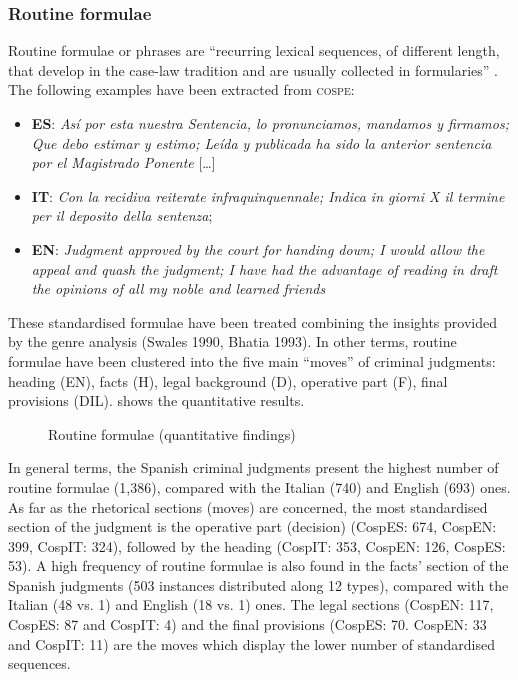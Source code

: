 \documentclass[output=paper]{LSP/langsci}
\begin{document}
\subsubsection{Routine formulae}
Routine formulae or phrases are “recurring lexical sequences, of different length, that develop in the case-law tradition and are usually collected in formularies” \citep[28--29]{Kjær1990}. The following examples have been extracted from \textsc{cospe}:

\begin{itemize}
\item \textbf{ES}: \textit{Así por esta nuestra Sentencia, lo pronunciamos, mandamos y firmamos; Que debo estimar y estimo; Leída y publicada ha sido la anterior sentencia por el Magistrado Ponente} […]
\item \textbf{IT}: \textit{Con la recidiva reiterate infraquinquennale; Indica in giorni X il termine per il deposito della sentenza};
\item \textbf{EN}: \textit{Judgment approved by the court for handing down; I would allow the appeal and quash the judgment; I have had the advantage of reading in draft the opinions of all my noble and learned friends}
\end{itemize}

These standardised formulae have been treated combining the insights provided by the genre analysis (Swales 1990, Bhatia 1993). In other terms, routine formulae have been clustered into the five main “moves” of criminal judgments: heading (EN), facts (H), legal background (D), operative part (F), final provisions (DIL).  shows the quantitative results.

\begin{figure}

\caption{Routine formulae (quantitative findings)} \label{fig:6:4}
\end{figure}

In general terms, the Spanish criminal judgments present the highest number of routine formulae (1,386), compared with the Italian (740) and English (693) ones. As far as the rhetorical sections (moves) are concerned, the most standardised section of the judgment is the operative part (decision) (CospES: 674, CospEN: 399, CospIT: 324), followed by the heading (CospIT: 353, CospEN: 126, CospES: 53). A high frequency of routine formulae is also found in the facts’ section of the Spanish judgments (503 instances distributed along 12 types), compared with the Italian (48 vs. 1) and English (18 vs. 1) ones. The legal sections (CospEN: 117, CospES: 87 and CospIT: 4) and the final provisions (CospES: 70. CospEN: 33 and CospIT: 11) are the moves which display the lower number of standardised sequences.
\end{document}

